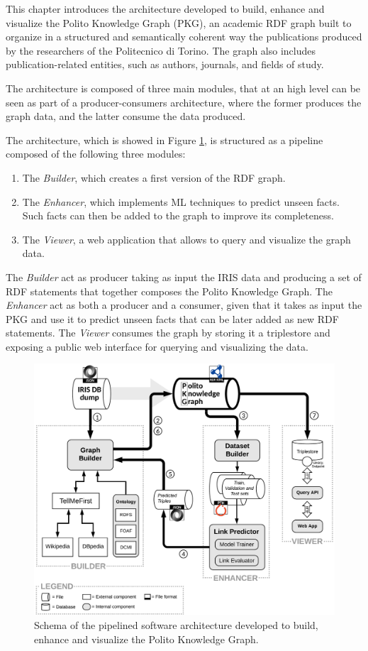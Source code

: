 \documentclass[%
    corpo=13.5pt,
    twoside,
    oldstyle,
    tipotesi=magistrale,
    greek,
    evenboxes
]{toptesi}
\begin{document}
This chapter introduces the architecture developed to build, enhance
and visualize the Polito Knowledge Graph (PKG), an academic RDF graph
built to organize in a structured and semantically coherent way the publications
produced by the researchers of the Politecnico di Torino. The graph
also includes publication-related entities, such as authors, journals,
and fields of study.

The architecture is composed of three main modules, that at an high level
can be seen as part of a producer-consumers architecture, where the former
produces the graph data, and the latter consume the data produced.

The architecture, which is showed in Figure \ref{fig:pipeline}, is structured
as a pipeline composed of the following three modules:

\begin{enumerate}
    \item The \emph{Builder}, which creates a first version of the
    RDF graph.
    \item The \emph{Enhancer}, which implements ML techniques to predict
    unseen facts. Such facts can then be added to the graph to improve its
    completeness.
    \item The \emph{Viewer}, a web application that allows to query
    and visualize the graph data.
\end{enumerate}

The \emph{Builder} act as producer taking as input the IRIS data
and producing a set of RDF statements that together composes the
Polito Knowledge Graph.
The \emph{Enhancer} act as both a producer and a consumer, given that it
takes as input the PKG and use it to predict unseen facts that can be
later added as new RDF statements.
The \emph{Viewer} consumes the graph by storing it a triplestore and exposing
a public web interface for querying and visualizing the data.


\begin{figure}[h]
    \centering
    \includegraphics[scale=0.8]{img/pipeline.png}
    \caption{Schema of the pipelined software architecture developed to build,
    enhance and visualize the Polito Knowledge Graph.}
    \label{fig:pipeline}
\end{figure}
\end{document}
